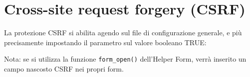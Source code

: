 \section*{Cross-site request forgery (CSRF)}
La protezione \ac{CSRF} si abilita agendo sul file di configurazione generale, e più precisamente impostando il parametro sul valore booleano TRUE:


Nota: se si utilizza la funzione \verb|form_open()| dell'Helper Form, verrà inserito un campo nascosto \ac{CSRF} nei propri form.